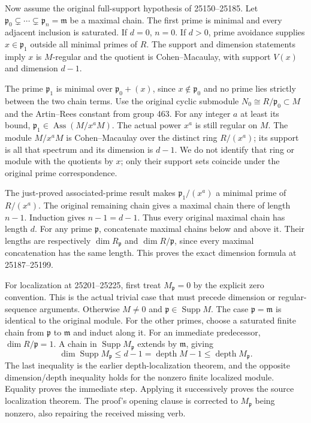 Now assume the original full-support hypothesis of 25150--25185. Let \(\mathfrak p_0\subsetneq\cdots\subsetneq\mathfrak p_n=\mathfrak m\) be a maximal chain. The first prime is minimal and every adjacent inclusion is saturated. If \(d=0\), \(n=0\). If \(d>0\), prime avoidance supplies \(x\in\mathfrak p_1\) outside all minimal primes of \(R\). The support and dimension statements imply \(x\) is \(M\)-regular and the quotient is Cohen--Macaulay, with support \(V(x)\) and dimension \(d-1\).

The prime \(\mathfrak p_1\) is minimal over \(\mathfrak p_0+(x)\), since \(x\notin\mathfrak p_0\) and no prime lies strictly between the two chain terms. Use the original cyclic submodule \(N_0\cong R/\mathfrak p_0\subset M\) and the Artin--Rees constant from group 463. For any integer \(a\) at least its bound, \(\mathfrak p_1\in\operatorname{Ass}(M/x^aM)\). The actual power \(x^a\) is still regular on \(M\). The module \(M/x^aM\) is Cohen--Macaulay over the distinct ring \(R/(x^a)\); its support is all that spectrum and its dimension is \(d-1\). We do not identify that ring or module with the quotients by \(x\); only their support sets coincide under the original prime correspondence.

The just-proved associated-prime result makes \(\mathfrak p_1/(x^a)\) a minimal prime of \(R/(x^a)\). The original remaining chain gives a maximal chain there of length \(n-1\). Induction gives \(n-1=d-1\). Thus every original maximal chain has length \(d\). For any prime \(\mathfrak p\), concatenate maximal chains below and above it. Their lengths are respectively \(\dim R_{\mathfrak p}\) and \(\dim R/\mathfrak p\), since every maximal concatenation has the same length. This proves the exact dimension formula at 25187--25199.

For localization at 25201--25225, first treat \(M_{\mathfrak p}=0\) by the explicit zero convention. This is the actual trivial case that must precede dimension or regular-sequence arguments. Otherwise \(M\ne0\) and \(\mathfrak p\in\operatorname{Supp}M\). The case \(\mathfrak p=\mathfrak m\) is identical to the original module. For the other primes, choose a saturated finite chain from \(\mathfrak p\) to \(\mathfrak m\) and induct along it. For an immediate predecessor, \(\dim R/\mathfrak p=1\). A chain in \(\operatorname{Supp}M_{\mathfrak p}\) extends by \(\mathfrak m\), giving \[
 \dim\operatorname{Supp}M_{\mathfrak p}\le d-1
 =\operatorname{depth}M-1
 \le\operatorname{depth}M_{\mathfrak p}.
\] The last inequality is the earlier depth-localization theorem, and the opposite dimension/depth inequality holds for the nonzero finite localized module. Equality proves the immediate step. Applying it successively proves the source localization theorem. The proof's opening clause is corrected to \(M_{\mathfrak p}\) being nonzero, also repairing the received missing verb.

